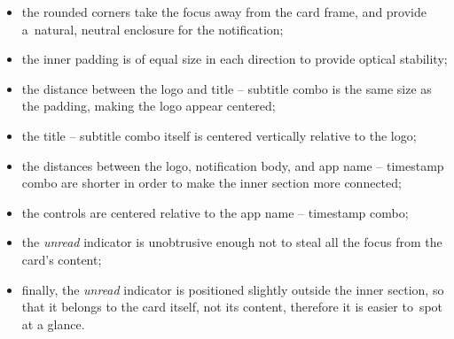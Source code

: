 \begin{itemize}
      \item
            the rounded corners take the focus away from the card frame,
            and provide a~natural, neutral enclosure for the notification;
      \item
            the inner padding is of equal size in each direction
            to provide optical stability;
      \item
            the distance between the logo and title -- subtitle combo
            is the same size as the padding,
            making the logo appear centered;
      \item
            the title -- subtitle combo itself
            is centered vertically relative to the logo;
      \item
            the distances between the logo,
            notification body, and app name -- timestamp combo are shorter
            in order to make the inner section more connected;
      \item
            the controls are centered relative to the app name -- timestamp combo;
      \item
            the \textit{unread} indicator is unobtrusive enough
            not to steal all the focus from the card's content;
      \item
            finally, the \textit{unread} indicator
            is positioned slightly outside the inner section,
            so that it belongs to the card itself,
            not its content,
            therefore it is easier to~spot at a glance.
\end{itemize}

